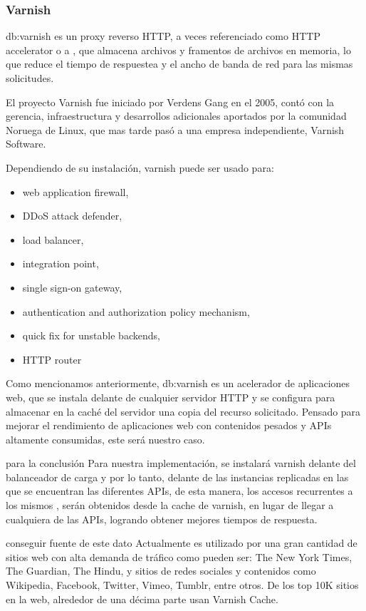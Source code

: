 \subsubsection{Varnish}
\label{soa:tecnologias:varnish}

\gls{db:varnish} es un proxy reverso HTTP, a veces referenciado como HTTP accelerator o a , que almacena archivos y framentos de archivos en memoria, lo que reduce el tiempo de respuestea y el ancho de banda de red para las mismas solicitudes.\cite[p.~20]{varnish2016}

El proyecto Varnish fue iniciado por Verdens Gang en el 2005, contó con la gerencia, infraestructura y desarrollos adicionales aportados por la comunidad Noruega de Linux, que mas tarde pasó a una empresa independiente, Varnish Software.

Dependiendo de su instalación, varnish puede ser usado para:

\begin{itemize}
  \item web application firewall,
  \item DDoS attack defender,
  \item load balancer,
  \item integration point,
  \item single sign-on gateway,
  \item authentication and authorization policy mechanism,
  \item quick fix for unstable backends,
  \item HTTP router
\end{itemize}

Como mencionamos anteriormente, \gls{db:varnish} es un acelerador de aplicaciones web, que se instala delante de cualquier servidor HTTP y se configura para almacenar en la caché del servidor una copia del recurso solicitado. Pensado para mejorar el rendimiento de aplicaciones web con contenidos pesados y APIs altamente consumidas, este será nuestro caso.

para la conclusión
Para nuestra implementación, se instalará varnish delante del balanceador de carga y por lo tanto, delante de las instancias replicadas en las que se encuentran las diferentes APIs, de esta manera, los accesos recurrentes a los mismos , serán obtenidos desde la cache de varnish, en lugar de llegar a cualquiera de las APIs, logrando obtener mejores tiempos de respuesta.


conseguir fuente de este dato
Actualmente es utilizado por una gran cantidad de sitios web con alta demanda de tráfico como pueden ser: The New York Times, The Guardian, The Hindu, y sitios de redes sociales y contenidos como Wikipedia, Facebook, Twitter, Vimeo, Tumblr, entre otros. De los top 10K sitios en la web, alrededor de una décima parte usan Varnish Cache.


